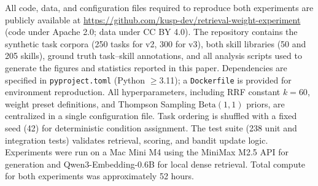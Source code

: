 All code, data, and configuration files required to reproduce both experiments are publicly available at \url{https://github.com/kusp-dev/retrieval-weight-experiment} (code under Apache 2.0; data under CC BY 4.0).
The repository contains the synthetic task corpora (250 tasks for v2, 300 for v3), both skill libraries (50 and 205 skills), ground truth task--skill annotations, and all analysis scripts used to generate the figures and statistics reported in this paper.
Dependencies are specified in \texttt{pyproject.toml} (Python $\geq$3.11); a \texttt{Dockerfile} is provided for environment reproduction.
All hyperparameters, including RRF constant $k{=}60$, weight preset definitions, and Thompson Sampling $\text{Beta}(1,1)$ priors, are centralized in a single configuration file.
Task ordering is shuffled with a fixed seed (42) for deterministic condition assignment.
The test suite (238 unit and integration tests) validates retrieval, scoring, and bandit update logic.
Experiments were run on a Mac Mini M4 using the MiniMax M2.5 API for generation and Qwen3-Embedding-0.6B for local dense retrieval.
Total compute for both experiments was approximately 52 hours.
